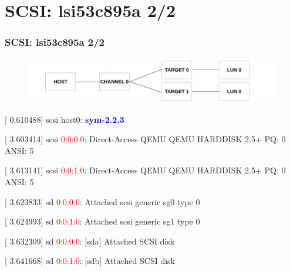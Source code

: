 \documentclass[aspectratio=169]{beamer}
\begin{document}
\section{SCSI: lsi53c895a 2/2}
\begin{frame}
\frametitle{SCSI: lsi53c895a 2/2}
\begin{figure}
\includegraphics[width=1.0\linewidth]{figures/megasas.pdf}
\end{figure}
\begin{block}{}
[    0.610488] scsi host0: \textbf{\textcolor{blue}{sym-2.2.3}}

[    3.603414] scsi \textcolor{red}{0:0:0:0}: Direct-Access     QEMU     QEMU HARDDISK    2.5+ PQ: 0 ANSI: 5

[    3.613141] scsi \textcolor{red}{0:0:1:0}: Direct-Access     QEMU     QEMU HARDDISK    2.5+ PQ: 0 ANSI: 5

[    3.623833] sd \textcolor{red}{0:0:0:0}: Attached scsi generic sg0 type 0

[    3.624993] sd \textcolor{red}{0:0:1:0}: Attached scsi generic sg1 type 0

[    3.632309] sd \textcolor{red}{0:0:0:0}: [sda] Attached SCSI disk

[    3.641668] sd \textcolor{red}{0:0:1:0}: [sdb] Attached SCSI disk
\end{block}
\end{frame}

\end{document}
